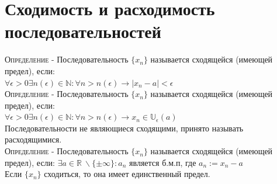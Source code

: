 \documentclass[14pt]{article}
\begin{document}
    \section{Сходимость и расходимость последовательностей}
        \textsc{Определение} - Последовательность $\{x_n\}$ называется сходящейся (имеющей предел), если: \\ $\forall \epsilon > 0 \exists n(\epsilon) \in \mathbb{N}: \forall n > n(\epsilon) \rightarrow |x_n - a| < \epsilon$ \\
        \textsc{Определение} - Последовательность $\{x_n\}$ называется сходящейся (имеющей предел), если: \\ $\forall \epsilon > 0 \exists n(\epsilon) \in \mathbb{N}: \forall n > n(\epsilon) \rightarrow x_n \in \mathbb{U}_{\epsilon} (a)$ \\
        Последовательности не являющиеся сходящими, принято называть расходящимися. \\
        \textsc{Определение} - Последовательность $\{x_n\}$ называется сходящейся (имеющей предел), если: $\exists a \in \mathbb{R}\ \backslash \{ \pm \infty \}: a_n$ является б.м.п, где $a_n := x_n - a$ \\
        Если $\{x_n\}$ сходиться, то она имеет единственный предел.
\end{document}
